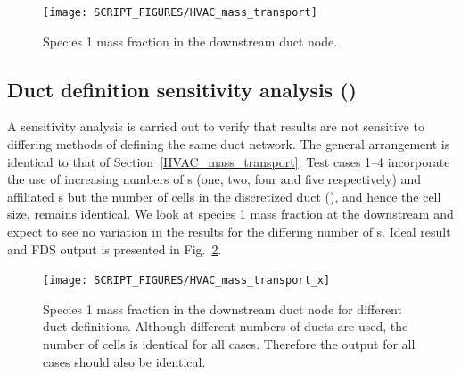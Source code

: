\documentclass[11pt]{book}
\begin{document}
\begin{figure}[ht]
\centering
\texttt{[image: SCRIPT\_FIGURES/HVAC\_mass\_transport]}
\caption[ test case]{Species \num{1} mass fraction in the downstream duct node.}
\label{fig_HVAC_mass_transport}
\end{figure}

\subsection{Duct definition sensitivity analysis (\texorpdfstring{}{HVAC\_mass\_transport\_\x})}
\label{HVAC_mass_transport_1}
\label{HVAC_mass_transport_2}
\label{HVAC_mass_transport_3}
\label{HVAC_mass_transport_4}
A sensitivity analysis is carried out to verify that results are not sensitive to differing methods of defining the same duct network. The general arrangement is identical to that of Section~\ref{HVAC_mass_transport}. Test cases \numrange{1}{4} incorporate the use of increasing numbers of s (one, two, four and five respectively) and affiliated s but the number of cells in the discretized duct (), and hence the cell size, remains identical. We look at species \num{1} mass fraction at the downstream  and expect to see no variation in the results for the differing number of s. Ideal result and FDS output is presented in Fig.~\ref{fig_HVAC_mass_transport_x}.

\begin{figure}[ht]
\centering
\texttt{[image: SCRIPT\_FIGURES/HVAC\_mass\_transport\_x]}
\caption[ test case]{Species \num{1} mass fraction in the downstream duct node for different duct definitions. Although different numbers of ducts are used, the number of cells is identical for all cases. Therefore the output for all cases should also be identical.}
\label{fig_HVAC_mass_transport_x}
\end{figure}
\end{document}
